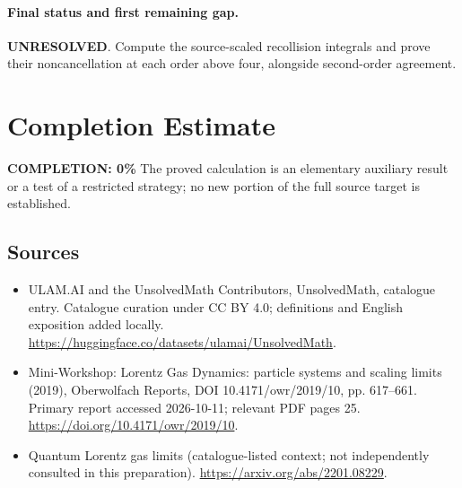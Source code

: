 \documentclass[11pt]{article}
\begin{document}
\paragraph{Final status and first remaining gap.}
\textbf{UNRESOLVED}. Compute the source-scaled recollision integrals and prove their noncancellation at each order above four, alongside second-order agreement.

\section{Completion Estimate}
\noindent\textbf{COMPLETION: 0\%}
The proved calculation is an elementary auxiliary result or a test of a restricted strategy; no new portion of the full source target is established.

\subsection{Sources}
\begin{itemize}
\item[\hypertarget{source:statement:1}{S1}] ULAM.AI and the UnsolvedMath Contributors, UnsolvedMath, catalogue entry. Catalogue curation under CC BY 4.0; definitions and English exposition added locally.
\url{https://huggingface.co/datasets/ulamai/UnsolvedMath}.
\item[\hypertarget{source:statement:2}{S2}] Mini-Workshop: Lorentz Gas Dynamics: particle systems and scaling limits (2019), Oberwolfach Reports, DOI 10.4171/owr/2019/10, pp. 617--661. Primary report accessed 2026-10-11; relevant PDF pages 25.
\url{https://doi.org/10.4171/owr/2019/10}.
\item[\hypertarget{source:statement:3}{S3}] Quantum Lorentz gas limits (catalogue-listed context; not independently consulted in this preparation).
\url{https://arxiv.org/abs/2201.08229}.
\end{itemize}
\label{end:statement}
\end{document}
